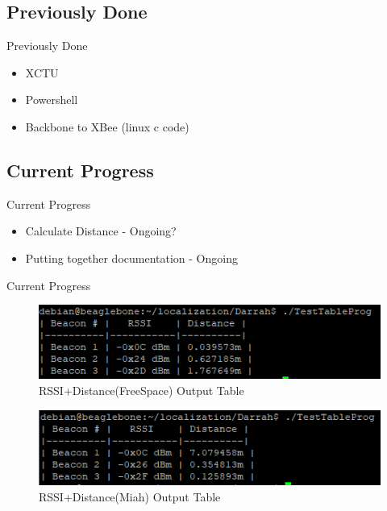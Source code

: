 \documentclass{beamer}
\begin{document}

\subsection{Previously Done}
\begin{frame}{Previously Done}
    \begin{itemize}
    \item XCTU
    \item Powershell
    \item Backbone to XBee (linux c code)
    \end{itemize}
\end{frame}


\subsection{Current Progress}
\begin{frame}{Current Progress}
    \begin{itemize}
    
    \item Calculate Distance - Ongoing?
    \item Putting together documentation - Ongoing
    \end{itemize}
\end{frame}

\begin{frame}{Current Progress}
    \begin{figure}
    \centering
    \includegraphics[scale=0.9]{figs/ScreenShots/RSSIOutputTableDist.PNG}
    \caption{RSSI+Distance(FreeSpace) Output Table}
    \label{fig:RSSIOutputTable}
    \end{figure}
    
    \begin{figure}
    \centering
    \includegraphics[scale=0.9]{figs/ScreenShots/RSSIOutputTableDist_2.PNG}
    \caption{RSSI+Distance(Miah) Output Table}
    \label{fig:RSSIOutputTable}
    \end{figure}
\end{frame}
\end{document}
